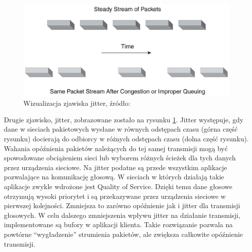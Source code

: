 \begin{figure}[h!]
	\centering
		\includegraphics[width=\linewidth]{jitter}
	\caption{Wizualizacja zjawiska jitter, źródło: \cite{jitter}}
	\label{fig:jitter}
\end{figure}

Drugie zjawisko, jitter, zobrazowane zostało na rysunku \ref{fig:jitter}. Jitter występuje, gdy dane w sieciach pakietowych wysłane w równych odstępach czasu (górna część rysunku) docierają do odbiorcy w różnych odstępach czasu (dolna część rysunku). Wahania opóźnienia pakietów należących do tej samej transmisji mogą być spowodowane obciążeniem sieci lub wyborem różnych ścieżek dla tych danych przez urządzenia sieciowe. Na jitter podatne są przede wszystkim aplikacje pozwalające na komunikację głosową. W sieciach w których działają takie aplikacje zwykle  wdrożone jest Quality of Service. Dzięki temu dane głosowe otrzymują wysoki priorytet i są przekazywane przez urządzenia sieciowe w pierwszej kolejności. Zmniejsza to zarówno opóźnienie jak i jitter dla transmisji głosowych. W celu dalszego zmniejszenia wpływu jitter na działanie transmisji, implementowane są bufory w aplikacji klienta. Takie rozwiązanie pozwala na powtórne ``wygładzenie'' strumienia pakietów, ale zwiększa całkowite opóźnienie transmisji.

